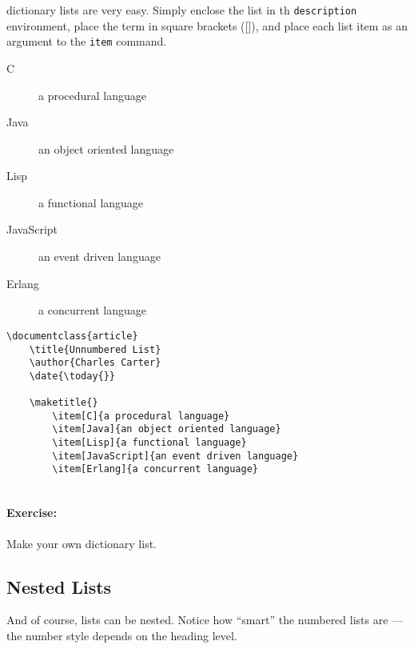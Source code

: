         \Lx{} dictionary lists are very easy. Simply enclose the list in th \texttt{description} environment, place the term in square brackets ([]), and place each list item as an argument to the \texttt{item} command.

    \begin{description}
        \item[C]{a procedural language}
        \item[Java]{an object oriented language}
        \item[Lisp]{a functional language}
        \item[JavaScript]{an event driven language}
        \item[Erlang]{a concurrent language}
    \end{description}

        \begin{verbatim}
\documentclass{article}
    \title{Unnumbered List}
    \author{Charles Carter}
    \date{\today{}}
 
    \maketitle{}
        \item[C]{a procedural language}
        \item[Java]{an object oriented language}
        \item[Lisp]{a functional language}
        \item[JavaScript]{an event driven language}
        \item[Erlang]{a concurrent language}
    
        \end{verbatim}

        \paragraph{Exercise:} Make your own dictionary list.

        \subsection{Nested Lists}
        \label{Nested Lists}

        And of course, \Lx{} lists can be nested. Notice how ``smart'' the numbered lists are --- the number style depends on the heading level.

